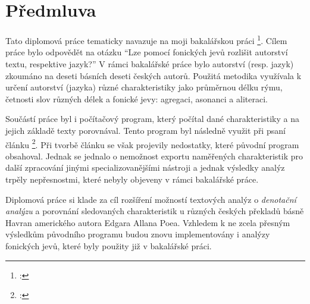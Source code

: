 \documentclass[dp.tex]{subfiles}
\begin{document}
\chapter*{Předmluva}
\label{chap:predmluva} 

Tato diplomová práce tematicky navazuje na moji bakalářskou práci \footnote{\cite{Slahora2012}: }. Cílem práce bylo odpovědět na otázku \enquote{Lze pomocí fonických jevů rozlišit autorství textu, respektive jazyk?} V rámci bakalářské práce bylo autorství (resp. jazyk) zkoumáno na deseti básních deseti českých autorů. Použitá metodika využívala k určení autorství (jazyka) různé charakteristiky jako průměrnou délku rýmu, četnosti slov různých délek a fonické jevy: agregaci, asonanci a aliteraci.

Součástí práce byl i počítačový program, který počítal dané charakteristiky a na jejich základě texty porovnával. Tento program byl následně využit při psaní článku \footnote{\cite{Marek2013}: }. Při tvorbě článku se však projevily nedostatky, které původní program obsahoval. Jednak se jednalo o nemožnost exportu naměřených charakteristik pro další zpracování jinými specializovanějšími nástroji a jednak výsledky analýz trpěly nepřesnostmi, které nebyly objeveny v rámci bakalářské práce.

Diplomová práce si klade za cíl rozšíření možností textových analýz o \textit{denotační analýzu} a porovnání sledovaných charakteristik u různých českých překladů básně Havran amerického autora Edgara Allana Poea. Vzhledem k ne zcela přesným výsledkům původního programu budou znovu implementovány i analýzy fonických jevů, které byly použity již v bakalářské práci.
\end{document}
